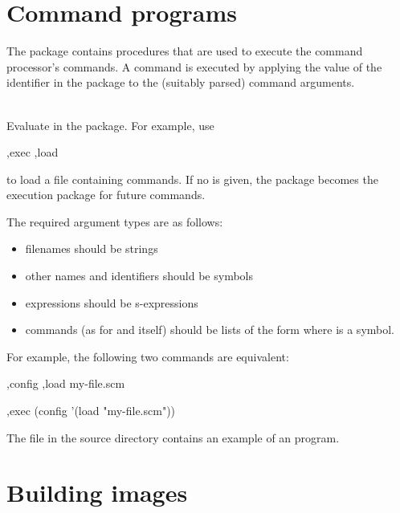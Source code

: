 \section{Command programs}
\label{command-programs}

The  package contains procedures that are used
 to execute the command processor's commands.
A command  is executed by applying the value of
 the identifier  in the  package to
 the (suitably parsed) command arguments.

\begin{description}
\item {}\\
   Evaluate  in the  package.
   For example, use
\begin{example}
,exec ,load 
\end{example}
to load a file containing commands.
If no  is given, the  package becomes the
 execution package for future commands.
\end{description}

The required argument types are as follows:
\begin{itemize}
\item filenames should be strings
\item other names and identifiers should be symbols
\item expressions should be s-expressions
\item commands (as for  and  itself)
 should be lists of the form
 where  is a symbol.
\end{itemize}

For example, the following two commands are equivalent:
\begin{example}
,config ,load my-file.scm

,exec (config '(load "my-file.scm"))
\end{example}

The file  in the source directory contains an
 example of an  program.

\section{Building images}

